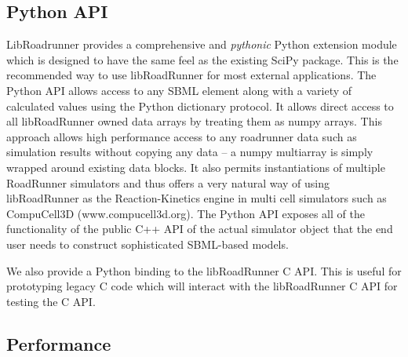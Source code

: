 \documentclass{bioinfo}
\begin{document}
\subsection{Python API}

LibRoadrunner provides a comprehensive and \emph{pythonic} Python extension module which is designed to have the same feel as the existing SciPy package.  This is the recommended way to use libRoadRunner for most external applications. The Python API allows access to any SBML element along with a variety of calculated values using the Python dictionary protocol. It allows direct access to all libRoadRunner owned data arrays by treating them as numpy arrays. This approach allows high performance access to any roadrunner data such as simulation results without copying any data -- a numpy multiarray is simply wrapped around existing data blocks. It also permits instantiations of multiple RoadRunner simulators and thus offers a very natural way of using libRoadRunner as the Reaction-Kinetics engine in multi cell simulators such as CompuCell3D (www.compucell3d.org). The Python API exposes all of the functionality of the public C++ API of the actual simulator object that the end user needs to construct sophisticated SBML-based models. 

We also provide a Python binding to the libRoadRunner C API. This is useful for prototyping legacy C code which will interact with the libRoadRunner C API for testing the C API.  

\subsection{Performance}
\end{document}
